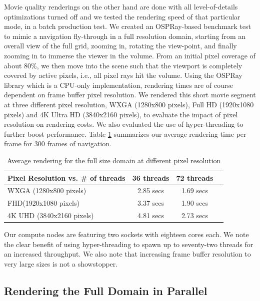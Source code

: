 \documentclass[5p,times]{elsarticle}
\begin{document}
Movie quality renderings on the other hand are done with all level-of-details
optimizations turned off and we tested the rendering speed of that particular
mode, in a batch production test.
We created an OSPRay-based benchmark test to mimic a navigation fly-through in
a full resolution domain, starting from an overall view of the full grid, zooming in, rotating
the view-point, and finally zooming in to immerse the viewer in the volume. From
an initial pixel coverage of about 80\%, we then move into the scene such that
the viewport is completely covered by active pixels, i.e., all pixel rays hit the volume.
Using the OSPRay library which is a CPU-only implementation, rendering times are of course
dependent on frame buffer pixel resolution. We rendered this short movie segment
at three different pixel resolution, WXGA (1280x800 pixels), Full HD (1920x1080 pixels)
and 4K Ultra HD (3840x2160 pixels), to evaluate the impact of pixel resolution on rendering costs.
We also evaluated the use of hyper-threading to further boost performance.
Table \ref{tab:osprayThreads} summarizes
our average rendering time per frame for 300 frames of navigation.

\begin{table}[htb]
  \centering
  \caption{
    Average rendering for the full size domain at different pixel resolution
  }
  \label{tab:osprayThreads}

  \begin{tabular}{lccc}
    \hline
    Pixel Resolution vs. \# of threads  & 36 threads & 72 threads\\
    \hline
    WXGA (1280x800 pixels) & 2.85 secs &  1.69 secs \\
    FHD(1920x1080 pixels) & 3.37 secs &  1.90 secs \\
    4K UHD (3840x2160 pixels) & 4.81 secs &  2.73 secs \\
    \hline

  \end{tabular}
\end{table}

Our compute nodes are featuring two sockets with eighteen cores each. We note the clear benefit of using hyper-threading to spawn up to seventy-two threads for an increased throughput. We also note that increasing frame buffer resolution to very large sizes is not a showstopper. 

\subsection{Rendering the Full Domain in Parallel}
\end{document}
